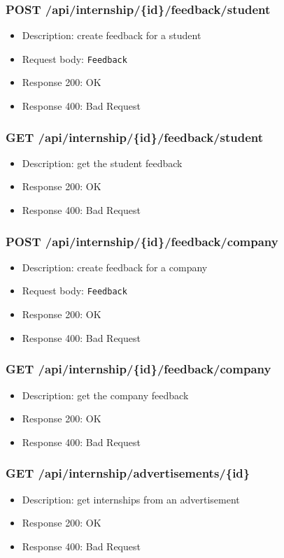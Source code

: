 \subsubsection{POST /api/internship/\{id\}/feedback/student}
\begin{itemize}
    \item Description: create feedback for a student
    \item Request body: \verb|Feedback|
    \item Response 200: OK
    \item Response 400: Bad Request
\end{itemize}

\subsubsection{GET /api/internship/\{id\}/feedback/student}
\begin{itemize}
    \item Description: get the student feedback
    \item Response 200: OK
    \item Response 400: Bad Request
\end{itemize}

\subsubsection{POST /api/internship/\{id\}/feedback/company}
\begin{itemize}
    \item Description: create feedback for a company
    \item Request body: \verb|Feedback|
    \item Response 200: OK
    \item Response 400: Bad Request
\end{itemize}

\subsubsection{GET /api/internship/\{id\}/feedback/company}
\begin{itemize}
    \item Description: get the company feedback
    \item Response 200: OK
    \item Response 400: Bad Request
\end{itemize}

\subsubsection{GET /api/internship/advertisements/\{id\}}
\begin{itemize}
    \item Description: get internships from an advertisement
    \item Response 200: OK
    \item Response 400: Bad Request
\end{itemize}

